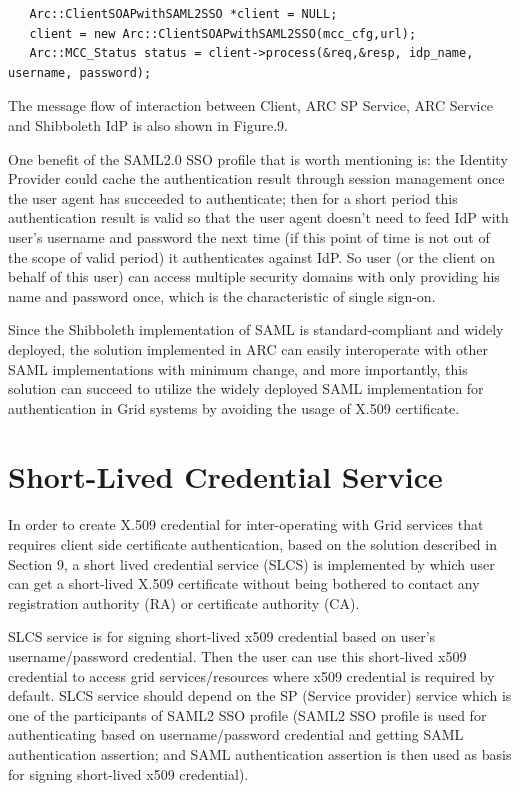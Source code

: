 \documentclass{article}                            %
\begin{document}
\begin{verbatim}
   Arc::ClientSOAPwithSAML2SSO *client = NULL; 
   client = new Arc::ClientSOAPwithSAML2SSO(mcc_cfg,url); 
   Arc::MCC_Status status = client->process(&req,&resp, idp_name, username, password); 
\end{verbatim}

    The message flow of interaction between Client, ARC SP Service, ARC Service and Shibboleth IdP is also shown in Figure.9. 

  One benefit of the SAML2.0 SSO profile that is worth mentioning is: the Identity Provider could cache the authentication result through session management once the user agent has succeeded to authenticate; then for a short period this authentication result is valid so that the user agent doesn’t need to feed IdP with user’s username and password the next time (if this point of time is not out of the scope of valid period) it authenticates against IdP. So user (or the client on behalf of this user) can access multiple security  domains with only providing his name and password once, which is the characteristic of single sign-on.

    Since the Shibboleth implementation of SAML is standard-compliant and widely deployed, the solution implemented in ARC can easily interoperate with other SAML implementations with minimum change, and more importantly, this solution can succeed to utilize the widely deployed SAML implementation for authentication in Grid systems by avoiding the usage of X.509 certificate.




\section{Short-Lived Credential Service} %
\label{sec:slcs}
In order to create X.509 credential for inter-operating with Grid services that requires client side certificate authentication, based on the solution described in Section 9, a short lived credential service (SLCS) is implemented by which user can get a short-lived X.509 certificate without being bothered to contact any registration authority (RA) or certificate authority (CA). 

    SLCS service is for signing short-lived x509 credential based on user's username/password credential. Then the user can use this short-lived x509 credential to access grid services/resources where x509 credential is required by default. SLCS service should depend on the SP (Service provider) service which is one of the participants of SAML2 SSO profile (SAML2 SSO profile is used for authenticating based on username/password credential and getting SAML authentication assertion; and SAML authentication assertion is then used as basis for signing short-lived x509 credential).
\end{document}
